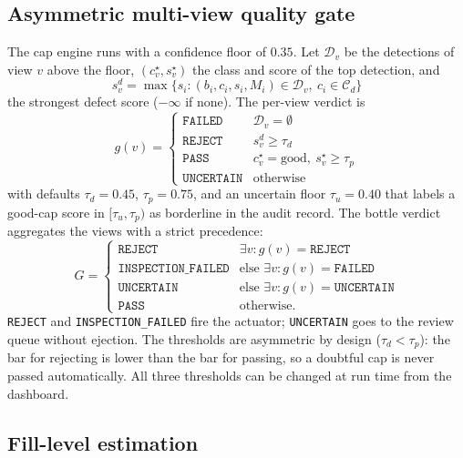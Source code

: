 \subsection{Asymmetric multi-view quality gate}
\label{sec:gate-impl}
The cap engine runs with a confidence floor of $0.35$. Let $\mathcal{D}_v$ be the detections of view $v$ above the floor, $(c^\star_v, s^\star_v)$ the class and score of the top detection, and
\begin{equation}
    s^{d}_v = \max\{s_i : (b_i,c_i,s_i,M_i)\in\mathcal{D}_v,\ c_i\in\mathcal{C}_d\}
\end{equation}
the strongest defect score ($-\infty$ if none). The per-view verdict is
\begin{equation}
    g(v)=\begin{cases}
    \texttt{FAILED} & \mathcal{D}_v=\emptyset\\
    \texttt{REJECT} & s^{d}_v \geq \tau_d\\
    \texttt{PASS} & c^\star_v=\text{good},\ s^\star_v\geq\tau_p\\
    \texttt{UNCERTAIN} & \text{otherwise}
    \end{cases}
    \label{eq:gate}
\end{equation}
with defaults $\tau_d=0.45$, $\tau_p=0.75$, and an uncertain floor $\tau_u=0.40$ that labels a good-cap score in $[\tau_u,\tau_p)$ as borderline in the audit record. The bottle verdict aggregates the views with a strict precedence:
\begin{equation}
    G = \begin{cases}
    \texttt{REJECT} & \exists v: g(v)=\texttt{REJECT}\\
    \texttt{INSPECTION\_FAILED} & \text{else } \exists v: g(v)=\texttt{FAILED}\\
    \texttt{UNCERTAIN} & \text{else } \exists v: g(v)=\texttt{UNCERTAIN}\\
    \texttt{PASS} & \text{otherwise.}
    \end{cases}
    \label{eq:agg}
\end{equation}
\texttt{REJECT} and \texttt{INSPECTION\_FAILED} fire the actuator; \texttt{UNCERTAIN} goes to the review queue without ejection. The thresholds are asymmetric by design ($\tau_d<\tau_p$): the bar for rejecting is lower than the bar for passing, so a doubtful cap is never passed automatically. All three thresholds can be changed at run time from the dashboard.

\subsection{Fill-level estimation}
\label{sec:fill-impl}

